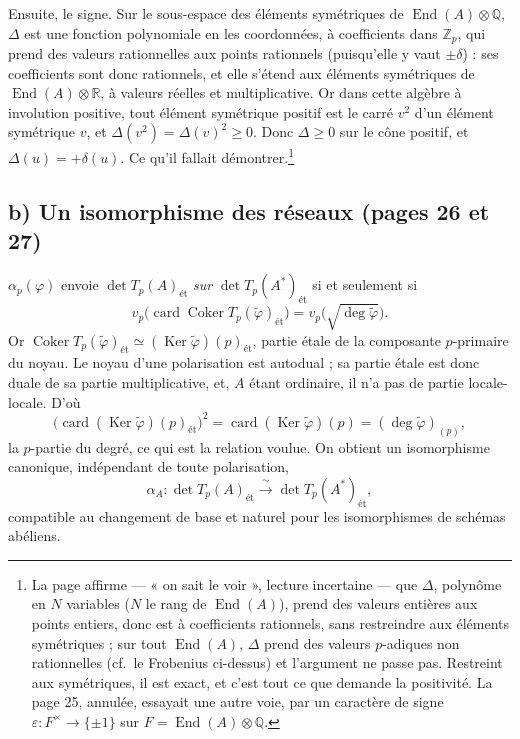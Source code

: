 \documentclass[11pt,a4paper]{article}
\begin{document}
Ensuite, le signe. Sur le sous-espace des éléments symétriques de
$\operatorname{End}(A) \otimes \mathbb{Q}$, $\Delta$ est une fonction
polynomiale en les coordonnées, à coefficients dans $\mathbb{Z}_p$, qui prend
des valeurs rationnelles aux points rationnels (puisqu'elle y vaut $\pm\delta$) :
ses coefficients sont donc rationnels, et elle s'étend aux éléments
symétriques de $\operatorname{End}(A) \otimes \mathbb{R}$, à valeurs réelles et
multiplicative. Or dans cette algèbre à involution positive, tout élément
symétrique positif est le carré $v^2$ d'un élément symétrique $v$, et
$\Delta(v^2) = \Delta(v)^2 \geq 0$. Donc $\Delta \geq 0$ sur le cône positif,
et $\Delta(u) = +\delta(u)$. Ce qu'il fallait démontrer.\footnote{La page
affirme --- « on sait le voir », lecture incertaine --- que $\Delta$, polynôme
en $N$ variables ($N$ le rang de $\operatorname{End}(A)$), prend des valeurs
entières aux points entiers, donc est à coefficients rationnels, sans
restreindre aux éléments symétriques ; sur tout $\operatorname{End}(A)$, $\Delta$ prend des
valeurs $p$-adiques non rationnelles (cf.\ le Frobenius ci-dessus) et
l'argument ne passe pas. Restreint aux symétriques, il est exact, et c'est
tout ce que demande la positivité. La page 25, annulée, essayait une autre
voie, par un caractère de signe $\varepsilon : F^\times \to \{\pm 1\}$ sur $F =
\operatorname{End}(A) \otimes \mathbb{Q}$.}

\subsection*{b) Un isomorphisme des réseaux (pages 26 et 27)}

$\alpha_p(\varphi)$ envoie $\det T_p(A)_{\text{ét}}$ \emph{sur} $\det
T_p(A^*)_{\text{ét}}$ si et seulement si
\[
v_p\bigl(\operatorname{card}\operatorname{Coker} T_p(\tilde\varphi)_{\text{ét}}\bigr)
= v_p\bigl(\sqrt{\deg\tilde\varphi}\bigr) .
\]
Or $\operatorname{Coker} T_p(\tilde\varphi)_{\text{ét}} \simeq (\operatorname{Ker}
\tilde\varphi)(p)_{\text{ét}}$, partie étale de la composante $p$-primaire du
noyau. Le noyau d'une polarisation est autodual ; sa partie étale est donc
duale de sa partie multiplicative, et, $A$ étant ordinaire, il n'a pas de
partie locale-locale. D'où
\[
\bigl(\operatorname{card}(\operatorname{Ker}\tilde\varphi)(p)_{\text{ét}}\bigr)^2
= \operatorname{card}(\operatorname{Ker}\tilde\varphi)(p) =
(\deg\tilde\varphi)_{(p)} ,
\]
la $p$-partie du degré, ce qui est la relation voulue. On obtient un
isomorphisme canonique, indépendant de toute polarisation,
\[
\alpha_A : \det T_p(A)_{\text{ét}} \xrightarrow{\ \sim\ } \det
T_p(A^*)_{\text{ét}} ,
\]
compatible au changement de base et naturel pour les isomorphismes de schémas
abéliens.
\end{document}
